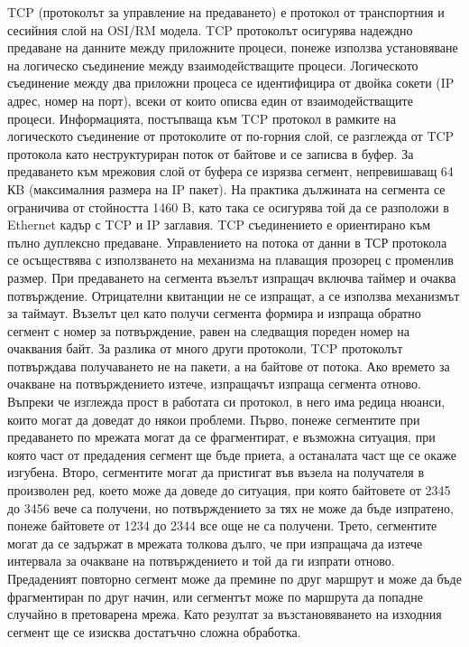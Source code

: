 \documentclass{article}
\begin{document}
TCP (протоколът за управление на предаването) е протокол от транспортния и сесийния слой на OSI/RM модела. TCP протоколът
осигурява надеждно предаване на данните между приложните процеси, понеже използва установяване на логическо съединение между
взаимодействащите процеси. Логическото съединение между два приложни процеса се идентифицира от двойка сокети (IP адрес, номер на
порт), всеки от които описва един от взаимодействащите процеси.
Информацията, постъпваща към TCP протокол в рамките на логическото съединение от протоколите от по-горния слой, се разглежда от
TCP протокола като неструктуриран поток от байтове и се записва в буфер. За предаването към мрежовия слой от буфера се изрязва
сегмент, непревишаващ 64 КB (максималния размера на IP пакет). На практика дължината на сегмента се ограничива от стойността
1460 B, като така се осигурява той да се разположи в Ethernet кадър с TCP и IP заглавия.
TCP съединението е ориентирано към пълно дуплексно предаване. Управлението на потока от данни в ТСР протокола се осъществява с
използването на механизма на плаващия прозорец с променлив размер. При предаването на сегмента възелът изпращач включва таймер и
очаква потвърждение. Отрицателни квитанции не се изпращат, а се използва механизмът за таймаут. Възелът цел като получи сегмента
формира и изпраща обратно сегмент с номер за потвърждение, равен на следващия пореден
номер на очаквания байт. За разлика от много други протоколи, TCP протоколът потвърждава получаването не на пакети, а на байтове
от потока. Ако времето за очакване на потвърждението изтече, изпращачът изпраща сегмента отново.
Въпреки че изглежда прост в работата си протокол, в него има редица нюанси, които могат да доведат до някои проблеми. Първо,
понеже сегментите при предаването по мрежата могат да се фрагментират, е възможна ситуация, при която част от предадения сегмент
ще бъде приета, а останалата част ще се окаже изгубена. Второ, сегментите могат да пристигат във възела на получателя в
произволен ред, което може да доведе до ситуация, при която байтовете от 2345 до 3456 вече са получени, но потвърждението за тях
не може да бъде изпратено, понеже байтовете от 1234 до 2344 все още не са получени. Трето, сегментите могат да се задържат в
мрежата толкова дълго, че при изпращача да изтече интервала за очакване на потвърждението и той да ги изпрати отново. Предаденият
повторно сегмент може да премине по друг маршрут и може да бъде фрагментиран по друг начин, или сегментът може по маршрута да
попадне случайно в претоварена мрежа. Като резултат за възстановяването на изходния сегмент ще се изисква достатъчно сложна обработка.
\end{document}
